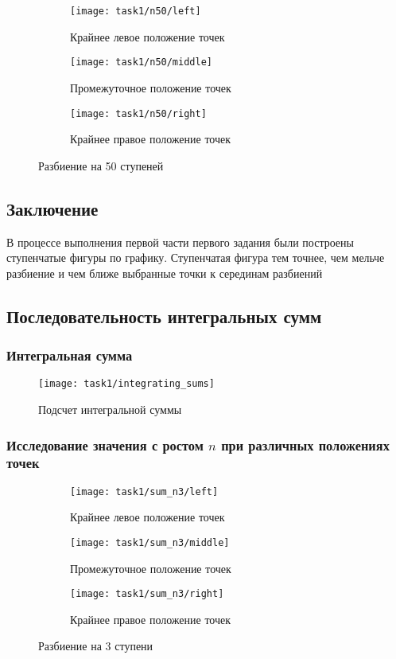 \begin{figure}[H]
	\centering
	\begin{subfigure}{0.3\textwidth}
		\centering
		\texttt{[image: task1/n50/left]}\quad
		\caption*{Крайнее левое положение точек}
	\end{subfigure}
	\begin{subfigure}{0.3\textwidth}
		\centering
		\texttt{[image: task1/n50/middle]}\quad
		\caption*{Промежуточное положение точек}
	\end{subfigure}
	\begin{subfigure}{0.3\textwidth}
		\centering
		\texttt{[image: task1/n50/right]}\quad
		\caption*{Крайнее правое положение точек}
	\end{subfigure}
	\caption{Разбиение на 50 ступеней}
\end{figure}
\subsection*{Заключение}
В процессе выполнения первой части первого задания были построены ступенчатые фигуры по графику. Ступенчатая фигура тем точнее, чем мельче разбиение и чем ближе выбранные точки к серединам разбиений
\subsection{Последовательность интегральных сумм}
\subsubsection*{Интегральная сумма}
\begin{figure}[H]
	\centering
	\texttt{[image: task1/integrating\_sums]}\\
	\caption{Подсчет интегральной суммы}
\end{figure}
\subsubsection*{Исследование значения с ростом $ n $ при различных положениях точек}
\begin{figure}[H]
	\centering
	\begin{subfigure}{0.3\textwidth}
		\centering
		\texttt{[image: task1/sum\_n3/left]}\quad
		\caption*{Крайнее левое положение точек}
	\end{subfigure}
	\begin{subfigure}{0.3\textwidth}
		\centering
		\texttt{[image: task1/sum\_n3/middle]}\quad
		\caption*{Промежуточное положение точек}
	\end{subfigure}
	\begin{subfigure}{0.3\textwidth}
		\centering
		\texttt{[image: task1/sum\_n3/right]}\quad
		\caption*{Крайнее правое положение точек}
	\end{subfigure}
	\caption{Разбиение на 3 ступени}
\end{figure}

